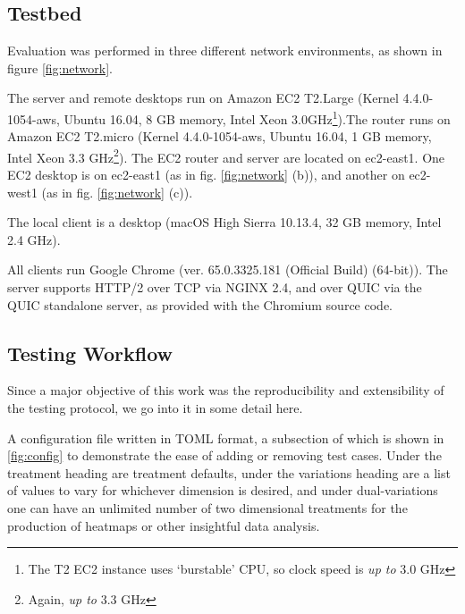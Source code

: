 \documentclass[12pt]{article}
\begin{document}
\subsection{Testbed}
Evaluation was performed in three different network environments, as shown in figure \ref{fig:network}.

The server and remote desktops run on Amazon EC2 T2.Large (Kernel 4.4.0-1054-aws, Ubuntu 16.04, 8 GB memory, Intel Xeon 3.0GHz\footnote{The T2 EC2 instance uses `burstable' CPU, so clock speed is \emph{up to} 3.0 GHz}).The router runs on Amazon EC2 T2.micro (Kernel 4.4.0-1054-aws, Ubuntu 16.04, 1 GB memory, Intel Xeon 3.3 GHz\footnote{Again, \emph{up to} 3.3 GHz}). The EC2 router and server are located on ec2-east1. One EC2 desktop is on ec2-east1 (as in fig. \ref{fig:network} (b)), and another on ec2-west1 (as in fig. \ref{fig:network} (c)).

The local client is a desktop (macOS High Sierra 10.13.4, 32 GB memory, Intel 2.4 GHz).

All clients run Google Chrome (ver. 65.0.3325.181 (Official Build) (64-bit)). The server supports HTTP/2 over TCP via NGINX 2.4, and over QUIC via the QUIC standalone server, as provided with the Chromium source code.

\subsection{Testing Workflow}
Since a major objective of this work was the reproducibility and extensibility of the testing protocol, we go into it in some detail here.

A configuration file written in TOML format, a subsection of which is shown in \ref{fig:config} to demonstrate the ease of adding or removing test cases. Under the treatment heading are treatment defaults, under the variations heading are a list of values to vary for whichever dimension is desired, and under dual-variations one can have an unlimited number of two dimensional treatments for the production of heatmaps or other insightful data analysis.
\end{document}
